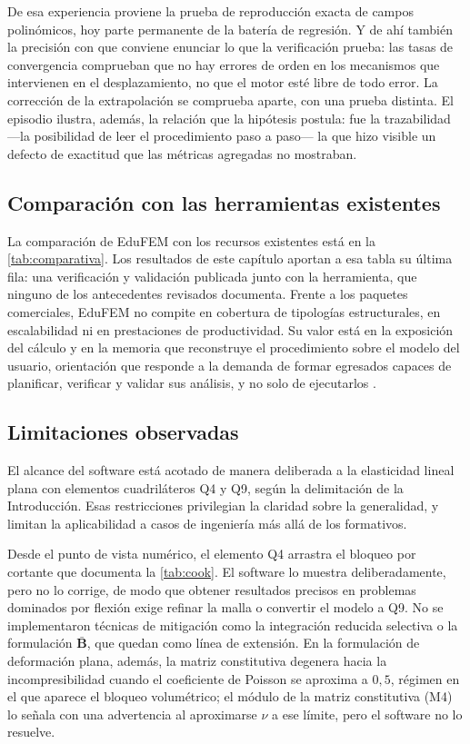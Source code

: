 De esa experiencia proviene la prueba de reproducción exacta de campos polinómicos, hoy parte permanente de la batería de regresión. Y de ahí también la precisión con que conviene enunciar lo que la verificación prueba: las tasas de convergencia comprueban que no hay errores de orden en los mecanismos que intervienen en el desplazamiento, no que el motor esté libre de todo error. La corrección de la extrapolación se comprueba aparte, con una prueba distinta. El episodio ilustra, además, la relación que la hipótesis postula: fue la trazabilidad —la posibilidad de leer el procedimiento paso a paso— la que hizo visible un defecto de exactitud que las métricas agregadas no mostraban.

\subsection{Comparación con las herramientas existentes}

La comparación de EduFEM con los recursos existentes está en la \autoref{tab:comparativa}. Los resultados de este capítulo aportan a esa tabla su última fila: una verificación y validación publicada junto con la herramienta, que ninguno de los antecedentes revisados documenta. Frente a los paquetes comerciales, EduFEM no compite en cobertura de tipologías estructurales, en escalabilidad ni en prestaciones de productividad. Su valor está en la exposición del cálculo y en la memoria que reconstruye el procedimiento sobre el modelo del usuario, orientación que responde a la demanda de formar egresados capaces de planificar, verificar y validar sus análisis, y no solo de ejecutarlos \autocite[pp.~1159, 1168]{perezsantiago2023fem}.

\subsection{Limitaciones observadas}

El alcance del software está acotado de manera deliberada a la elasticidad lineal plana con elementos cuadriláteros Q4 y Q9, según la delimitación de la Introducción. Esas restricciones privilegian la claridad sobre la generalidad, y limitan la aplicabilidad a casos de ingeniería más allá de los formativos.

Desde el punto de vista numérico, el elemento Q4 arrastra el bloqueo por cortante que documenta la \autoref{tab:cook}. El software lo muestra deliberadamente, pero no lo corrige, de modo que obtener resultados precisos en problemas dominados por flexión exige refinar la malla o convertir el modelo a Q9. No se implementaron técnicas de mitigación como la integración reducida selectiva o la formulación $\bar{\bm{B}}$, que quedan como línea de extensión. En la formulación de deformación plana, además, la matriz constitutiva degenera hacia la incompresibilidad cuando el coeficiente de Poisson se aproxima a $0{,}5$, régimen en el que aparece el bloqueo volumétrico; el módulo de la matriz constitutiva (M4) lo señala con una advertencia al aproximarse $\nu$ a ese límite, pero el software no lo resuelve.

